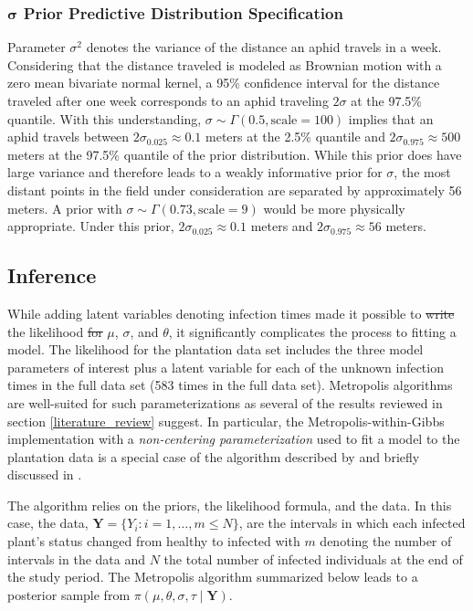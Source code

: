 \documentclass{uwstat572}
\newcommand{\vmdel}[1]{\sout{#1}}
\newcommand{\vmadd}[1]{\textbf{\color{red}{#1}}}
\begin{document}
\subsubsection{$\boldsymbol{\sigma}$ Prior Predictive Distribution Specification}
Parameter $\sigma^2$ denotes the variance of the distance an aphid travels in a week.
Considering that the distance traveled is modeled as Brownian motion with a zero mean bivariate normal kernel, a 95\% confidence interval for the distance traveled after one week corresponds to an aphid traveling $2\sigma$ at the 97.5\% quantile. 
With this understanding, $\sigma \sim \Gamma(0.5, \text{scale}=100)$ implies that an aphid travels between $2\sigma_{0.025} \approx 0.1$ meters at the 2.5\% quantile and $2\sigma_{0.975} \approx 500$ meters at the 97.5\% quantile of the prior distribution. 
While this prior does have large variance and therefore leads to a weakly informative prior for $\sigma$, the most distant points in the field under consideration are separated by approximately 56 meters. 
A prior with $\sigma \sim \Gamma(0.73, \text{scale}=9)$ would be more physically appropriate. 
Under this prior, $2\sigma_{0.025} \approx 0.1$ meters and $2\sigma_{0.975} \approx 56$ meters. 

\subsection{Inference}
\label{inference}
While adding latent variables denoting infection times made it possible to \vmdel{write} \vmadd{compute} the likelihood \vmdel{for} \vmadd{as a function of} $\mu$, $\sigma$, and $\theta$, it significantly complicates the process to fitting a model. 
The likelihood for the plantation data set includes the three model parameters of interest plus a latent variable for each of the unknown infection times in the full data set (583 times in the full data set). 
Metropolis algorithms are well-suited for such parameterizations as several of the results reviewed in section \ref{literature_review} suggest.  
In particular, the Metropolis-within-Gibbs implementation with a \textit{non-centering parameterization} used to fit a model to the plantation data is a special case of the algorithm described by \citet{Jewell} and briefly discussed in \citep{ONeill}.  

The algorithm relies on the priors, the likelihood formula, and the data. 
In this case, the data, $\textbf{Y} = \{Y_i:i=1,\dots, m \le N\}$, are the intervals in which each infected plant's status changed from healthy to infected with $m$ denoting the number of intervals in the data and $N$ the total number of infected individuals at the end of the study period. 
The Metropolis algorithm summarized below leads to a posterior sample from $\pi(\mu, \theta, \sigma, \tau \mid \textbf{Y})$. 
\end{document}
